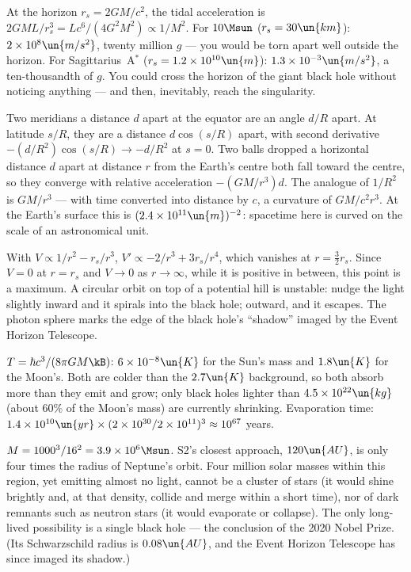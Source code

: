  At the horizon $r_s = 2GM/c^2$, the tidal acceleration is $2GML/r_s^3 = Lc^6/(4G^2M^2)\propto1/M^2$. For $10\Msun$ ($r_s = 30\un{km}$): $2\times10^{8}\un{m/s^2}$, twenty million $g$ --- you would be torn apart well outside the horizon. For Sagittarius~A$^*$ ($r_s = 1.2\times10^{10}\un{m}$): $1.3\times10^{-3}\un{m/s^2}$, a ten-thousandth of $g$. You could cross the horizon of the giant black hole without noticing anything --- and then, inevitably, reach the singularity.

 Two meridians a distance $d$ apart at the equator are an angle $d/R$ apart. At latitude $s/R$, they are a distance $d\cos(s/R)$ apart, with second derivative $-(d/R^2)\cos(s/R)\to-d/R^2$ at $s = 0$. Two balls dropped a horizontal distance $d$ apart at distance $r$ from the Earth's centre both fall toward the centre, so they converge with relative acceleration $-(GM/r^3)d$. The analogue of $1/R^2$ is $GM/r^3$ --- with time converted into distance by $c$, a curvature of $GM/c^2r^3$. At the Earth's surface this is $(2.4\times10^{11}\un{m})^{-2}$: spacetime here is curved on the scale of an astronomical unit.

 With $V\propto1/r^2 - r_s/r^3$, $V' \propto -2/r^3 + 3r_s/r^4$, which vanishes at $r = \tfrac32r_s$. Since $V = 0$ at $r = r_s$ and $V\to0$ as $r\to\infty$, while it is positive in between, this point is a maximum. A circular orbit on top of a potential hill is unstable: nudge the light slightly inward and it spirals into the black hole; outward, and it escapes. The photon sphere marks the edge of the black hole's ``shadow'' imaged by the Event Horizon Telescope.

 $T = \hbar c^3/(8\pi GM\kB)$: $6\times10^{-8}\un{K}$ for the Sun's mass and $1.8\un{K}$ for the Moon's. Both are colder than the $2.7\un{K}$ background, so both absorb more than they emit and grow; only black holes lighter than $4.5\times10^{22}\un{kg}$ (about $60\%$ of the Moon's mass) are currently shrinking. Evaporation time: $1.4\times10^{10}\un{yr}\times(2\times10^{30}/2\times10^{11})^3\approx10^{67}$ years.

 $M = 1000^3/16^2 = 3.9\times10^6\Msun$. S2's closest approach, $120\un{AU}$, is only four times the radius of Neptune's orbit. Four million solar masses within this region, yet emitting almost no light, cannot be a cluster of stars (it would shine brightly and, at that density, collide and merge within a short time), nor of dark remnants such as neutron stars (it would evaporate or collapse). The only long-lived possibility is a single black hole --- the conclusion of the 2020 Nobel Prize. (Its Schwarzschild radius is $0.08\un{AU}$, and the Event Horizon Telescope has since imaged its shadow.)

